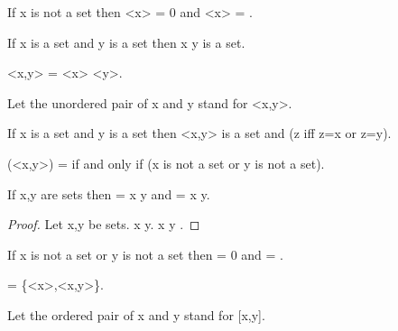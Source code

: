 \documentclass[a4paper,draft]{amsproc}
\begin{document}
\begin{forthel}
\begin{theorem}[44b]
If x is not a set then \bigcap <x> = 0
and \bigcup <x> = .
\end{theorem}

\begin{axiom}[IV]
If x is a set and y is a set then x \cup y is a set.
\end{axiom}

\begin{definition}[45] <x,y> = <x> \cup <y>.\end{definition}
Let the unordered pair of x and y stand for <x,y>.


\begin{theorem}[46a]
If x is a set and y is a set 
then <x,y> is a set and (z  iff z=x or z=y). 
\end{theorem}

\begin{theorem}[46b]
(<x,y>) =  if and only if (x is not a set or y is not a set).
\end{theorem}

\begin{theorem}[47a]
If x,y are sets then  = x \cap y
and  = x \cup y.
\end{theorem}
\begin{proof}
Let x,y be sets.
 \subset x \cup y.
x \cup y \subset {}.
\end{proof}

\begin{theorem}[47b]
If x is not a set or y is not a set then
 = 0 and  = .
\end{theorem}


\begin{definition}[48] [x,y] = \{<x>,<x,y>\}.\end{definition}
Let the ordered pair of x and y stand for [x,y].


\end{forthel}
\end{document}
